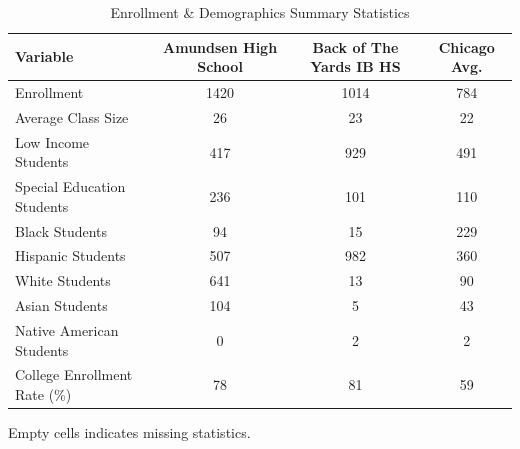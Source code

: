 \begin{table}[H]
\renewcommand{\arraystretch}{1.5}
\caption*{
{\large Enrollment \& Demographics Summary Statistics}
} 

\fontsize{10pt}{11pt}\selectfont

\begin{tabular*}{\linewidth}{@{\extracolsep{\fill}}lccc}
\toprule
Variable & Amundsen High School & Back of The Yards IB HS & Chicago Avg. \\ 
\midrule\addlinespace[2.5pt]
Enrollment & 1420 & 1014 & 784 \\
Average Class Size & 26 & 23 & 22 \\
Low Income Students & 417 & 929 & 491 \\
Special Education Students & 236 & 101 & 110 \\
Black Students & 94 & 15 & 229 \\
Hispanic Students & 507 & 982 & 360 \\
White Students & 641 & 13 & 90 \\
Asian Students & 104 & 5 & 43 \\
Native American Students & 0 & 2 & 2 \\
College Enrollment Rate (\%) & 78 & 81 & 59 \\
\bottomrule
\end{tabular*}
\begin{minipage}{\linewidth}
Empty cells indicates missing statistics.\\
\end{minipage}
\end{table}
